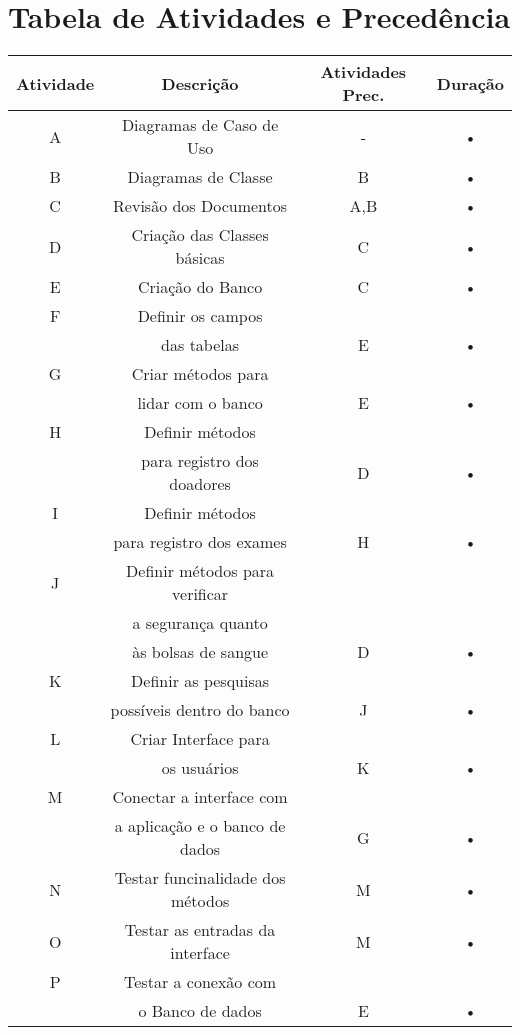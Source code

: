 \documentclass[12pt,a4paper,final]{report}
\begin{document}
\section*{Tabela de Atividades e Precedência}
\begin{center}
\begin{tabular}{|c|c|c|c|}
\hline 
Atividade & Descrição & Atividades Prec. & Duração \\ 
\hline 
A & Diagramas de Caso de Uso & - & • \\ 
\hline 
B & Diagramas de Classe & B & • \\ 
\hline 
C & Revisão dos Documentos & A,B & • \\ 
\hline 
D & Criação das Classes básicas & C & • \\ 
\hline 
E & Criação do Banco & C & • \\ 
\hline 
F & Definir os campos & & \\ & das tabelas & E & • \\ 
\hline 
G & Criar métodos para & & \\ & lidar com o banco & E & • \\
\hline 
H & Definir métodos & & \\ & para registro dos doadores & D & • \\ 
\hline 
I & Definir métodos & & \\ & para registro dos exames & H & • \\ 
\hline 
J & Definir métodos para verificar & & \\ & a segurança quanto & & \\ & às bolsas de sangue & D & • \\ 
\hline 
K & Definir as pesquisas  & & \\ & possíveis dentro do banco & J & • \\ 
\hline 
L & Criar Interface para & & \\ & os usuários & K & • \\ 
\hline 
M & Conectar a interface com & & \\ & a aplicação e o banco de dados & G & • \\ 
\hline 
N & Testar funcinalidade dos métodos & M & • \\ 
\hline 
O & Testar as entradas da interface & M & • \\ 
\hline 
P & Testar a conexão com & & \\ & o Banco de dados & E & • \\ 
\hline 
\end{tabular} 
\end{center}
\end{document}
